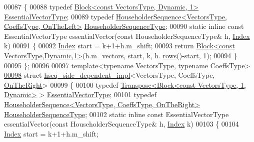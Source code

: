 \begin{DoxyCode}
00087 \{
00088   \textcolor{keyword}{typedef} \hyperlink{group___core___module_class_eigen_1_1_block}{Block<const VectorsType, Dynamic, 1>} 
      \hyperlink{group___core___module_class_eigen_1_1_block}{EssentialVectorType};
00089   \textcolor{keyword}{typedef} \hyperlink{group___householder___module_class_eigen_1_1_householder_sequence}{HouseholderSequence<VectorsType, CoeffsType, OnTheLeft>}
       \hyperlink{group___householder___module_class_eigen_1_1_householder_sequence}{HouseholderSequenceType};
00090   \textcolor{keyword}{static} \textcolor{keyword}{inline} \textcolor{keyword}{const} EssentialVectorType essentialVector(\textcolor{keyword}{const} HouseholderSequenceType& h, 
      \hyperlink{namespace_eigen_a62e77e0933482dafde8fe197d9a2cfde}{Index} k)
00091   \{
00092     \hyperlink{namespace_eigen_a62e77e0933482dafde8fe197d9a2cfde}{Index} start = k+1+h.m\_shift;
00093     \textcolor{keywordflow}{return} \hyperlink{group___core___module_class_eigen_1_1_block}{Block<const VectorsType,Dynamic,1>}(h.m\_vectors, start, k, h.
      \hyperlink{group___householder___module_a6eaafe2460930d1f4aa67d6e577b71f0}{rows}()-start, 1);
00094   \}
00095 \};
00096 
00097 \textcolor{keyword}{template}<\textcolor{keyword}{typename} VectorsType, \textcolor{keyword}{typename} CoeffsType>
\hyperlink{struct_eigen_1_1internal_1_1hseq__side__dependent__impl_3_01_vectors_type_00_01_coeffs_type_00_01_on_the_right_01_4}{00098} \textcolor{keyword}{struct }\hyperlink{struct_eigen_1_1internal_1_1hseq__side__dependent__impl}{hseq\_side\_dependent\_impl}<VectorsType, CoeffsType, 
      \hyperlink{group__enums_ggac22de43beeac7a78b384f99bed5cee0ba99dc75d8e00b6c3a5bdc31940f47492b}{OnTheRight}>
00099 \{
00100   \textcolor{keyword}{typedef} \hyperlink{group___core___module_class_eigen_1_1_transpose}{Transpose<Block<const VectorsType, 1, Dynamic>} > 
      \hyperlink{group___core___module_class_eigen_1_1_transpose}{EssentialVectorType};
00101   \textcolor{keyword}{typedef} \hyperlink{group___householder___module_class_eigen_1_1_householder_sequence}{HouseholderSequence<VectorsType, CoeffsType, OnTheRight>}
       \hyperlink{group___householder___module_class_eigen_1_1_householder_sequence}{HouseholderSequenceType};
00102   \textcolor{keyword}{static} \textcolor{keyword}{inline} \textcolor{keyword}{const} EssentialVectorType essentialVector(\textcolor{keyword}{const} HouseholderSequenceType& h, 
      \hyperlink{namespace_eigen_a62e77e0933482dafde8fe197d9a2cfde}{Index} k)
00103   \{
00104     \hyperlink{namespace_eigen_a62e77e0933482dafde8fe197d9a2cfde}{Index} start = k+1+h.m\_shift;

\end{DoxyCode}
